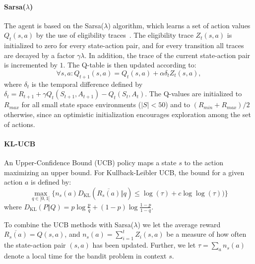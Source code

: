 
\paragraph{Sarsa($\lambda$)}
The agent is based on the Sarsa($\lambda$) algorithm, which learns a set of
action values $Q_t(s,a)$ by the use of eligibility
traces~\cite{Sutton:1998:IRL:551283}. The eligibility trace $Z_t(s,a)$ is
initialized to zero for every state-action pair, and for every transition all
traces are decayed by a factor $\gamma\lambda$. In addition, the trace of the
current state-action pair is incremented by $1$. The Q-table is then updated
according to:
\begin{equation}
        \forall s,a : Q_{t+1}(s,a) = Q_t(s,a) + \alpha\delta_t Z_t(s,a),
\end{equation}
where $\delta_t$ is the temporal difference defined by $\delta_t = R_{t+1} +
\gamma Q_t(S_{t+1},A_{t+1}) - Q_t(S_t,A_t)$. The Q-values are initialized to
$R_{max}$ for all small state space environments ($\vert{S}\vert < 50$) and to
$(R_{min}+R_{max})/2$ otherwise, since an optimistic initialization encourages
exploration among the set of actions.

\paragraph{KL-UCB}
An Upper-Confidence Bound (UCB) policy maps a state $s$ to the action maximizing
an upper bound. For Kullback-Leibler UCB, the bound for a given action $a$ is
defined by:
\begin{equation}
    \max_{q \in ]0,1[}\big\{n_s(a)
        D_{\mathrm{KL}}\left(\overline{R_s(a)}\Big\Vert{q}\right) \le \log(\tau) +
        c\log\log(\tau))\big\}
\end{equation}
where $D_\mathrm{KL}(P\Vert{Q}) = p \log
\frac{p}{q}+(1-p)\log\frac{1-p}{1-q}$.~\cite{DBLP:journals/jmlr/GarivierC11}

To combine the UCB methods with Sarsa($\lambda$) we let the average reward
$\overline{R_s(a)}=Q(s,a)$, and $n_s(a)=\sum_{i=1}^tZ_i(s,a)$ be a measure of
how often the state-action pair $(s,a)$ has been updated. Further, we let $\tau
= \sum_a{n_s(a)}$ denote a local time for the bandit problem in context $s$.



